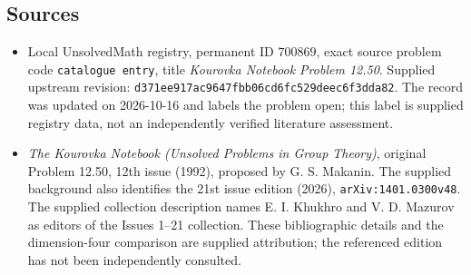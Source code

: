 \documentclass[11pt]{article}
\begin{document}
\subsection{Sources}
\begin{itemize}
\item Local UnsolvedMath registry, permanent ID \(700869\), exact source problem code \texttt{catalogue entry}, title \emph{Kourovka Notebook Problem 12.50}. Supplied upstream revision: \texttt{d371ee917ac9647fbb06cd6fc529deec6f3dda82}. The record was updated on 2026-10-16 and labels the problem open; this label is supplied registry data, not an independently verified literature assessment.
\item \emph{The Kourovka Notebook (Unsolved Problems in Group Theory)}, original Problem 12.50, 12th issue (1992), proposed by G. S. Makanin. The supplied background also identifies the 21st issue edition (2026), \texttt{arXiv:1401.0300v48}. The supplied collection description names E. I. Khukhro and V. D. Mazurov as editors of the Issues 1--21 collection. These bibliographic details and the dimension-four comparison are supplied attribution; the referenced edition has not been independently consulted.
\end{itemize}
\end{document}
